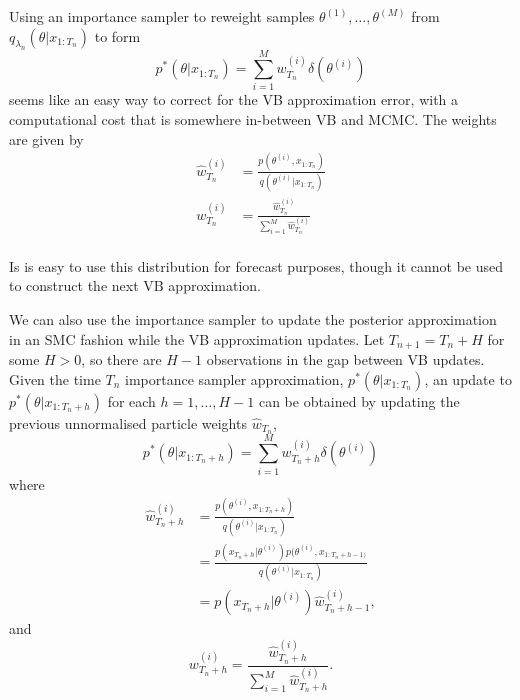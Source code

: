 \documentclass[12pt,a4paper]{article}\usepackage[]{graphicx}\usepackage[]{color}
\begin{document}
Using an importance sampler to reweight samples $\theta^{(1)}, \dots, \theta^{(M)}$ from $q_{\lambda_n}(\theta | x_{1:T_n})$ to form 
\begin{equation}
\label{IS:Approx}
p^*(\theta | x_{1:T_n}) = \sum_{i=1}^M w^{(i)}_{T_n} \delta(\theta^{(i)})
\end{equation}
seems like an easy way to correct for the VB approximation error, with a computational cost that is somewhere in-between VB and MCMC. The weights are given by
\begin{align}
\hat{w}^{(i)}_{T_n} &= \frac{p(\theta^{(i)}, x_{1:T_n})}{q(\theta^{(i)} | x_{1:T_n})} \label{IS:Weights} \\
w^{(i)}_{T_n} &= \frac{\hat{w}^{(i)}_{T_n}}{\sum_{i=1}^M \hat{w}^{(i)}_{T_n}} \label{IS:WeightsNorm}
\end{align}
\\

Is is easy to use this distribution for forecast purposes, though it cannot be used to construct the next VB approximation.

We can also use the importance sampler to update the posterior approximation in an SMC fashion while the VB approximation updates. Let $T_{n+1} = T_{n} + H$ for some $H > 0$, so there are $H-1$ observations in the gap between VB updates.
\\

Given the time $T_n$ importance sampler approximation, $p^*(\theta | x_{1:T_n})$, an update to $p^*(\theta | x_{1:T_n+h})$ for each $h = 1, \dots, H-1$ can be obtained by updating the previous unnormalised particle weights $\hat{w}_{T_n}$,
\begin{equation}
\label{IS:ApproxUpdate}
p^*(\theta | x_{1:T_n+h}) = \sum_{i=1}^M w^{(i)}_{T_n+h} \delta(\theta^{(i)})
\end{equation}
where
\begin{align}
\hat{w}^{(i)}_{T_n+h} &= \frac{p(\theta^{(i)}, x_{1:T_n+h})}{q(\theta^{(i)} | x_{1:T_n})} \nonumber \\
&= \frac{p(x_{T_n+h} | \theta^{(i)})p(\theta^{(i)}, x_{1:T_n+h-1)}}{q(\theta^{(i)} | x_{1:T_n})} \nonumber \\
&= p(x_{T_n+h} | \theta^{(i)}) \hat{w}^{(i)}_{T_n+h-1}, \label{IS:UpdateWeights}
\end{align}
and
\begin{equation}
\label{IS:UpdateWeightsNorma}
w^{(i)}_{T_n+h} = \frac{\hat{w}^{(i)}_{T_n+h}}{\sum_{i=1}^M \hat{w}^{(i)}_{T_n+h}}.
\end{equation}
\end{document}
